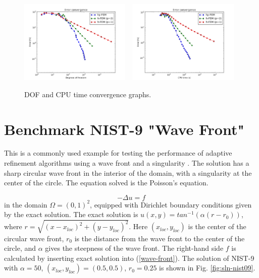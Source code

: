 \documentclass[12pt]{elsarticle}
\begin{document}
\begin{figure}[H]
\centering
\includegraphics[height=4cm]{nist/nist-8/conv_dof_aniso.png}\ \
\includegraphics[height=4cm]{nist/nist-8/conv_cpu_aniso.png}
\caption{DOF and CPU time convergence graphs.}
\label{fig:nist-8-conv}
\vspace{-2mm}
\end{figure}


\section{Benchmark NIST-9 "Wave Front"}
\label{sec:bench-9}

This is a commonly used example for testing the performance of
adaptive refinement algorithms using a wave front and a singularity \cite{mitchell-1, mitchell-2}.
The solution has a sharp circular wave front in the interior of the
domain, with a singularity at the center of the circle.
The equation solved is the Poisson's equation.

\begin{equation} \label{wave-front}
-\Delta u = f
\end{equation}
in the domain $\Omega = (0, 1)^2$, equipped with Dirichlet boundary conditions
given by the exact solution. The exact solution is
$u(x, y) = tan^{-1}(\alpha (r - r_{0}))$,
where $r = \sqrt{(x - x_{loc})^{2} + (y - y_{loc})^{2}}$.
Here $(x_{loc}, y_{loc})$ is the center of the circular wave front,
$r_{0}$ is the distance from the wave front to the center of the circle,
and $\alpha$ gives the steepness of the wave front.
The right-hand side $f$ is calculated by inserting exact solution into (\ref{wave-front}).
The solution of NIST-9 with $\alpha = 50$, $(x_{loc}, y_{loc}) = (0.5, 0.5)$,
$r_{0} = 0.25$ is shown in Fig. \ref{fig:sln-nist09}.
\end{document}
